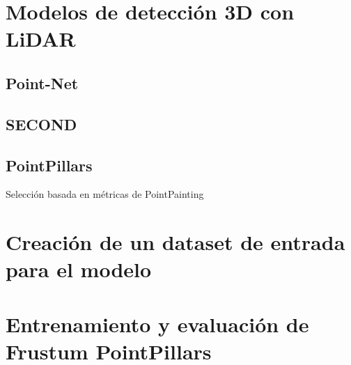 \section{Modelos de detección 3D con LiDAR}
\label{sec:Modelos de detección 3D con LiDAR}

\subsection{Point-Net}
\label{sec:Point-Net}

\subsection{SECOND}
\label{sec:SECOND}

\subsection{PointPillars}
\label{sec:PointPillars}

Selección basada en métricas de PointPainting

\section{Creación de un dataset de entrada para el modelo}
\label{sec:Creación de un dataset de entrada para el modelo}

\section{Entrenamiento y evaluación de Frustum PointPillars}
\label{sec:Entrenamiento y evaluación de Frustum PointPillars}
